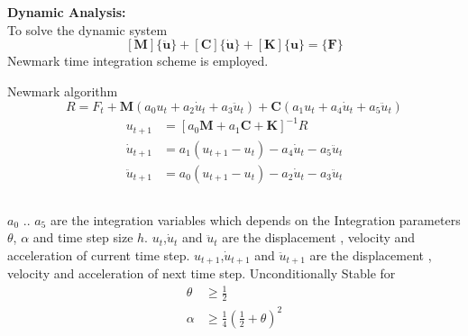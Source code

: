 \documentclass[9pt]{beamer}
\begin{document}
\begin{frame}
\textbf{Dynamic Analysis:}\\
To solve the dynamic system
\begin{equation*}
\left[ \mathbf{M}  \right] 
\{ \ddot{\mathbf{u}} \}
+
\left[ \mathbf{C}  \right] 
\{ \dot{\mathbf{u}} \}
+
\left[ \mathbf{K}  \right] 
\{\mathbf{u} \}
=
\{ \mathbf{F} \}
\end{equation*}
Newmark time integration scheme is employed. 
\begin{block}{Newmark algorithm}
\begin{equation*}
R=F_t + \mathbf{M} \left(a_0 u_{t}+a_2 \dot{u}_{t} + a_3 \ddot{u}_{t} \right) + \mathbf{C} \left(a_1 u_{t}+a_4 \dot{u}_{t} + a_5 \ddot{u}_{t} \right) 
\end{equation*}
\begin{align*}
u_{t+1} & =\left[a_0 \mathbf{M} + a_1 \mathbf{C} + \mathbf{K} \right] ^ {-1} R \\
\dot{u}_{t+1} & =a_1 \left( u_{t+1} - u_{t} \right) - a_4 \dot{u}_t -a_5 \ddot{u}_t \\
\ddot{u}_{t+1} & =a_0 \left( u_{t+1} - u_{t}\right) - a_2 \dot{u}_t -a_3 \ddot{u}_t
\end{align*}
\end{block}
\begin{columns}
$a_0$ .. $a_5$ are the integration variables which depends on the Integration parameters $\theta$, $\alpha$ and time step size $h$. 
$u_t$,$\dot{u}_t$ and $\ddot{u}_t$ are the displacement , velocity and acceleration of current time step. $u_{t+1}$,$\dot{u}_{t+1}$ and $\ddot{u}_{t+1}$ are the displacement , velocity and acceleration of next time step. 
Unconditionally Stable for
\begin{align*}
\theta & \geq \frac{1}{2}  \\
\alpha & \geq \frac{1}{4}\left(\frac{1}{2}+\theta \right)^2
\end{align*}

\end{columns}
\end{frame}
\end{document}
